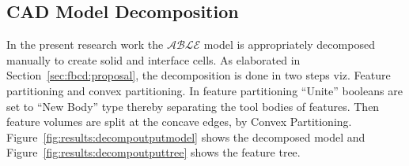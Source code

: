 \subsection{CAD Model Decomposition}

In the present research work the $\mathcal{ABLE}$ model is appropriately decomposed manually to create solid and interface cells. As elaborated in Section~\ref{sec:fbcd:proposal}, the decomposition is done in two steps viz. Feature partitioning and convex partitioning.  In feature partitioning ``Unite'' booleans are set to ``New Body'' type thereby separating the tool bodies of features. Then feature volumes are split at the concave edges, by Convex Partitioning. Figure~\ref{fig:results:decompoutputmodel} shows the decomposed model and Figure~\ref{fig:results:decompoutputtree} shows the feature tree.





